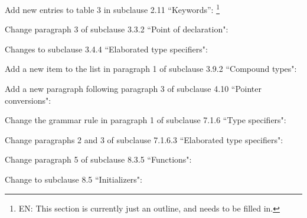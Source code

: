 Add new entries to table 3 in subclause 2.11 ``Keywords'':%
\footnote{EN:
This section is currently just an outline, and needs to be filled in.
}

Change paragraph 3 of subclause 3.3.2 ``Point of declaration":

Changes to subclause 3.4.4 ``Elaborated type specifiers":

Add a new item to the list in paragraph 1
of subclause 3.9.2 ``Compound types":

Add a new paragraph following paragraph 3
of subclause 4.10 ``Pointer conversions":

Change the grammar rule in paragraph 1 of subclause 7.1.6 ``Type specifiers":

Change paragraphs 2 and 3 of subclause 7.1.6.3 ``Elaborated type specifiers":

Change paragraph 5 of subclause 8.3.5 ``Functions":

Change to subclause 8.5 ``Initializers":
